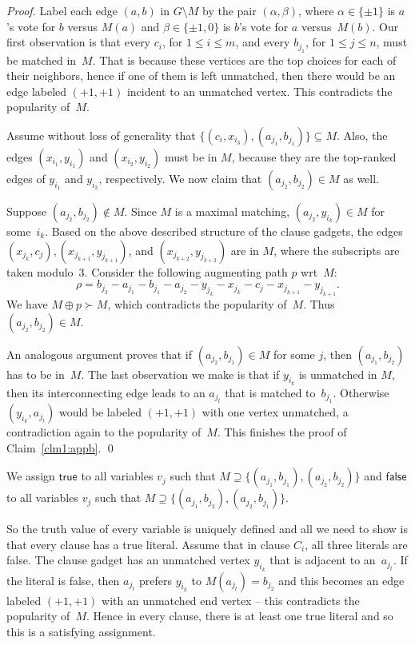 \documentclass[11pt]{llncs}
\begin{document}
\begin{proof}
Label each edge $(a,b)$ in $G\setminus M$ by the pair $(\alpha,\beta)$, where $\alpha \in \{\pm 1\}$ is $a$'s vote for $b$ versus $M(a)$ and 
$\beta \in \{\pm 1, 0\}$ is $b$'s vote for $a$ versus~$M(b)$. Our first observation is that every $c_i$, for $1 \leq i  \leq m$, and every 
$b_{j_1}$, for $1 \leq j \leq n$, must be matched in~$M$. That is because these vertices are the top choices for each of their neighbors, 
hence if one of them is left unmatched, then there would be an edge labeled $(+1,+1)$ incident to an unmatched vertex. This contradicts the 
popularity of~$M$.
 
Assume without loss of generality that $\{(c_i, x_{i_3}), (a_{j_1}, b_{j_1})\} \subseteq M$.  Also, the edges $(x_{i_1}, y_{i_1})$ and
$(x_{i_2}, y_{i_2})$ must be in $M$, because they are the top-ranked edges of $y_{i_1}$ and $y_{i_2}$, respectively. We now claim
that $(a_{j_2}, b_{j_2}) \in M$ as well. 

Suppose $(a_{j_2}, b_{j_2}) \notin M$. Since $M$ is a maximal matching, $(a_{j_2},y_{i_k}) \in M$ 
for some~$i_k$. Based on the above described structure of the clause gadgets, the edges $(x_{j_k},c_j), (x_{j_{k+1}}, y_{j_{k+1}})$, and 
$(x_{j_{k+2}}, y_{j_{k+2}})$ are in $M$, where the subscripts are taken modulo~3. 
Consider the following augmenting path $p$ wrt~$M$: 
\[ \rho = b_{j_2} - a_{j_1} - b_{j_1} - a_{j_2} - y_{j_k} - x_{j_k} - c_j - x_{j_{k+1}} - y_{j_{k+1}}.\]
We have $M \oplus p \succ M$, which contradicts the
popularity of~$M$. Thus $(a_{j_2}, b_{j_2}) \in M$. 

An analogous argument proves that if $(a_{j_2}, b_{j_1}) \in M$ for some $j$, then $(a_{j_1}, b_{j_2})$ has to be in~$M$. 
The last observation we make is that if $y_{i_k}$ is unmatched in $M$, then its interconnecting edge leads to an $a_{j_t}$  
that is matched to~$b_{j_1}$. Otherwise $(y_{i_k}, a_{j_t})$ would be labeled $(+1,+1)$ with one vertex unmatched, a contradiction 
again to the popularity of~$M$. This finishes the proof of Claim~\ref{clm1:appb}. \qed
\end{proof}

We assign $\mathsf{true}$ to all variables $v_j$ such that $M \supseteq \{(a_{j_1},b_{j_1}),(a_{j_2},b_{j_2})\}$ and 
$\mathsf{false}$ to all variables $v_j$ such that $M \supseteq \{(a_{j_1},b_{j_2}),(a_{j_2},b_{j_1})\}$.

So the truth value of every variable is uniquely defined and all we need to show is that every clause has a true literal. Assume that in clause $C_i$, all three 
literals are false. The clause gadget has an unmatched vertex $y_{i_k}$ that is adjacent to an~$a_{j_t}$. If the literal is false, 
then $a_{j_t}$ prefers $y_{i_k}$ to $M(a_{j_t}) = b_{j_2}$ and this becomes an edge labeled $(+1,+1)$ with an unmatched end vertex -- this 
contradicts the popularity of~$M$. Hence in every clause, there is at least one true literal and so this is a satisfying assignment.
\end{document}
